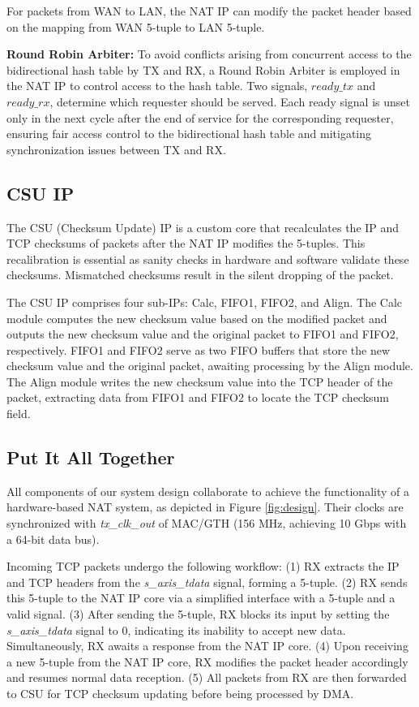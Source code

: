 For packets from WAN to LAN, the NAT IP can modify the packet header based on the mapping from WAN 5-tuple to LAN 5-tuple.

\textbf{Round Robin Arbiter:} To avoid conflicts arising from concurrent access to the bidirectional hash table by TX and RX, a Round Robin Arbiter is employed in the NAT IP to control access to the hash table. Two signals, $ready\_tx$ and $ready\_rx$, determine which requester should be served. Each ready signal is unset only in the next cycle after the end of service for the corresponding requester, ensuring fair access control to the bidirectional hash table and mitigating synchronization issues between TX and RX.

\subsection{CSU IP}
The CSU (Checksum Update) IP is a custom core that recalculates the IP and TCP checksums of packets after the NAT IP modifies the 5-tuples. This recalibration is essential as sanity checks in hardware and software validate these checksums. Mismatched checksums result in the silent dropping of the packet.

The CSU IP comprises four sub-IPs: Calc, FIFO1, FIFO2, and Align. The Calc module computes the new checksum value based on the modified packet and outputs the new checksum value and the original packet to FIFO1 and FIFO2, respectively. FIFO1 and FIFO2 serve as two FIFO buffers that store the new checksum value and the original packet, awaiting processing by the Align module. The Align module writes the new checksum value into the TCP header of the packet, extracting data from FIFO1 and FIFO2 to locate the TCP checksum field.

\subsection{Put It All Together}
All components of our system design collaborate to achieve the functionality of a hardware-based NAT system, as depicted in Figure \ref{fig:design}. Their clocks are synchronized with \emph{tx\_clk\_out} of MAC/GTH (156 MHz, achieving 10 Gbps with a 64-bit data bus).

Incoming TCP packets undergo the following workflow:
(1) RX extracts the IP and TCP headers from the \emph{s\_axis\_tdata} signal, forming a 5-tuple.
(2) RX sends this 5-tuple to the NAT IP core via a simplified interface with a 5-tuple and a valid signal.
(3) After sending the 5-tuple, RX blocks its input by setting the \emph{s\_axis\_tdata} signal to 0, indicating its inability to accept new data. Simultaneously, RX awaits a response from the NAT IP core.
(4) Upon receiving a new 5-tuple from the NAT IP core, RX modifies the packet header accordingly and resumes normal data reception.
(5) All packets from RX are then forwarded to CSU for TCP checksum updating before being processed by DMA.